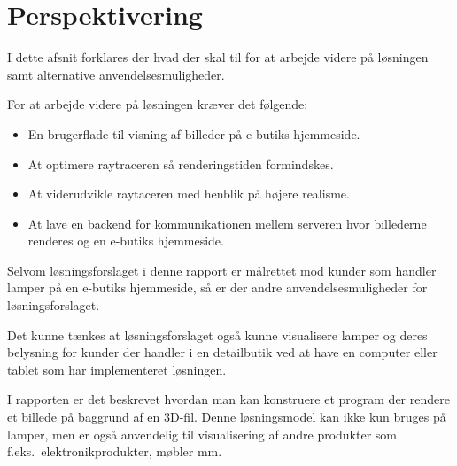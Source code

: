 \section{Perspektivering}
I dette afsnit forklares der hvad der skal til for at arbejde videre på løsningen samt alternative anvendelsesmuligheder. 

For at arbejde videre på løsningen kræver det følgende:

\begin{itemize}
\item En brugerflade til visning af billeder på e-butiks hjemmeside.
\item At optimere raytraceren så renderingstiden formindskes. 
\item At viderudvikle raytaceren med henblik på højere realisme. 
\item At lave en backend for kommunikationen mellem serveren hvor billederne renderes og en e-butiks hjemmeside.
\end{itemize}

Selvom løsningsforslaget i denne rapport er målrettet mod kunder som handler lamper på en e-butiks hjemmeside, så er der andre anvendelsesmuligheder for løsningsforslaget. 

Det kunne tænkes at løsningsforslaget også kunne visualisere lamper og deres belysning for kunder der handler i en detailbutik ved at have en computer eller tablet som har implementeret løsningen. 

I rapporten er det beskrevet hvordan man kan konstruere et program der rendere et billede på baggrund af en 3D-fil. Denne løsningsmodel kan ikke kun bruges på lamper, men er også anvendelig til visualisering af andre produkter som f.eks.\ elektronikprodukter, møbler mm.\ 






\clearpage